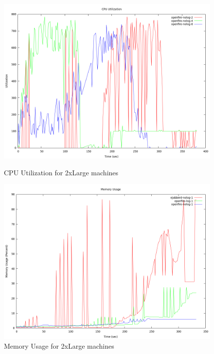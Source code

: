 \documentclass[a4paper, twocolumn]{article}
\begin{document}
\begin{figure}[ht] \label{ fig9} 
  \begin{minipage}[b]{0.5\linewidth}
    \includegraphics[width=0.9\linewidth]{2xlarge_cpu.png} 
    \caption{CPU Utilization for 2xLarge machines} 
  \end{minipage} 
  \begin{minipage}[b]{0.5\linewidth}
    \includegraphics[width=0.9\linewidth]{2xlarge_memory.png} 
    \caption{Memory Usage for 2xLarge machines} 
  \end{minipage} 
\end{figure}
\end{document}
